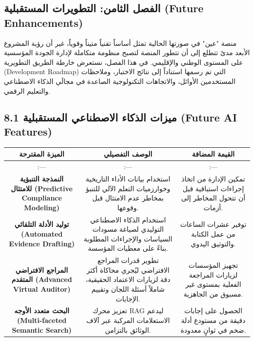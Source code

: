 \documentclass[12pt, a4paper]{report}
\begin{document}
\begin{english}
{\newpage
\chapter*{الفصل الثامن: التطويرات المستقبلية (Future Enhancements)}

منصة "عين" في صورتها الحالية تمثل أساساً تقنياً متيناً وقوياً، غير أن رؤية المشروع الأبعد مدىً تتطلع إلى أن تتطور المنصة لتصبح منظومة متكاملة لإدارة الجودة المؤسسية على المستوى الوطني والإقليمي. في هذا الفصل، نستعرض خارطة الطريق التطويرية (Development Roadmap) التي تم رسمها استناداً إلى نتائج الاختبار، وملاحظات المستخدمين الأوائل، والاتجاهات التكنولوجية الصاعدة في مجالَي الذكاء الاصطناعي والتعليم الرقمي. \\

\section*{8.1 ميزات الذكاء الاصطناعي المستقبلية (Future AI Features)}

\begin{longtable}{|c|c|c|}
\hline
الميزة المقترحة & الوصف التفصيلي & القيمة المضافة \\ \hline
:--- & :--- & :--- \\ \hline
\textbf{النمذجة التنبؤية للامتثال (Predictive Compliance Modeling)} & استخدام بيانات الأداء التاريخية وخوارزميات التعلم الآلي للتنبؤ بمخاطر عدم الامتثال قبل وقوعها. & تمكين الإدارة من اتخاذ إجراءات استباقية قبل أن تتحول المخاطر إلى أزمات. \\ \hline
\textbf{توليد الأدلة التلقائي (Automated Evidence Drafting)} & استخدام الذكاء الاصطناعي التوليدي لصياغة مسودات السياسات والإجراءات المطلوبة بناءً على معطيات المؤسسة. & توفير عشرات الساعات من عمل الكتابة والتوثيق اليدوي. \\ \hline
\textbf{المراجع الافتراضي المتقدم (Advanced Virtual Auditor)} & تطوير قدرات المراجع الافتراضي ليُجري محاكاة أكثر دقة لزيارات الاعتماد الحقيقية، شاملاً أسئلة اللجان وتقييم الإجابات. & تجهيز المؤسسات لزيارات المراجعة الفعلية بمستوى غير مسبوق من الجاهزية. \\ \hline
\textbf{البحث متعدد الأوجه (Multi-faceted Semantic Search)} & تعزيز محرك RAG ليدعم الاستعلامات المركبة عبر آلاف الوثائق بالتزامن. & الحصول على إجابات دقيقة من مستودع أدلة ضخم في ثوانٍ معدودة. \\ \hline
\end{longtable}

}
\end{english}
\end{document}
